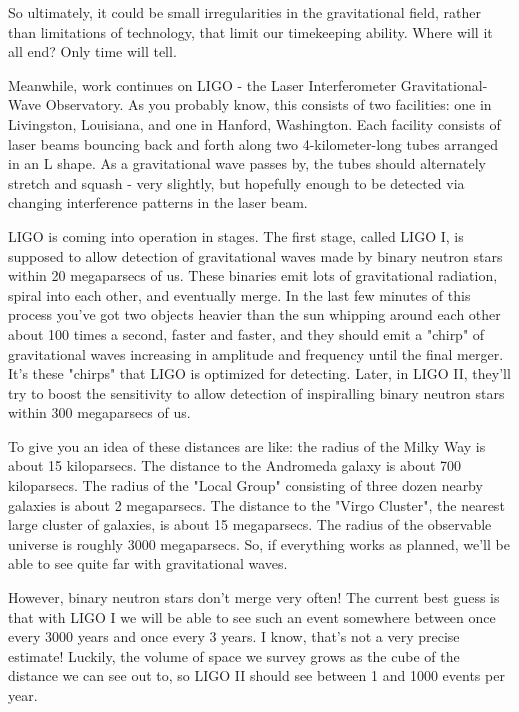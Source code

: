 So ultimately, it could be small irregularities in the gravitational
field, rather than limitations of technology, that limit our timekeeping
ability.  Where will it all end?  Only time will tell.

Meanwhile, work continues on LIGO - the Laser Interferometer
Gravitational-Wave Observatory.  As you probably know, this consists of
two facilities: one in Livingston, Louisiana, and one in Hanford,
Washington.  Each facility consists of laser beams bouncing back and
forth along two 4-kilometer-long tubes arranged in an L shape.  As a
gravitational wave passes by, the tubes should alternately stretch and
squash - very slightly, but hopefully enough to be detected via changing
interference patterns in the laser beam.

LIGO is coming into operation in stages.  The first stage, called LIGO
I, is supposed to allow detection of gravitational waves made by binary
neutron stars within 20 megaparsecs of us.  These binaries emit lots of
gravitational radiation, spiral into each other, and eventually merge.
In the last few minutes of this process you've got two objects heavier
than the sun whipping around each other about 100 times a second, faster
and faster, and they should emit a "chirp" of gravitational
waves increasing in amplitude and frequency until the final merger.
It's these "chirps" that LIGO is optimized for detecting.
Later, in LIGO II, they'll try to boost the sensitivity to allow
detection of inspiralling binary neutron stars within 300 megaparsecs of
us.

To give you an idea of these distances are like: the radius of the Milky
Way is about 15 kiloparsecs.  The distance to the Andromeda galaxy is
about 700 kiloparsecs.  The radius of the "Local Group"
consisting of three dozen nearby galaxies is about 2 megaparsecs.  The
distance to the "Virgo Cluster", the nearest large cluster of
galaxies, is about 15 megaparsecs.  The radius of the observable
universe is roughly 3000 megaparsecs.  So, if everything works as
planned, we'll be able to see quite far with gravitational waves.

However, binary neutron stars don't merge very often!  The current
best guess is that with LIGO I we will be able to see such an event
somewhere between once every 3000 years and once every 3 years.  I know,
that's not a very precise estimate!  Luckily, the volume of space we
survey grows as the cube of the distance we can see out to, so LIGO II
should see between 1 and 1000 events per year.

